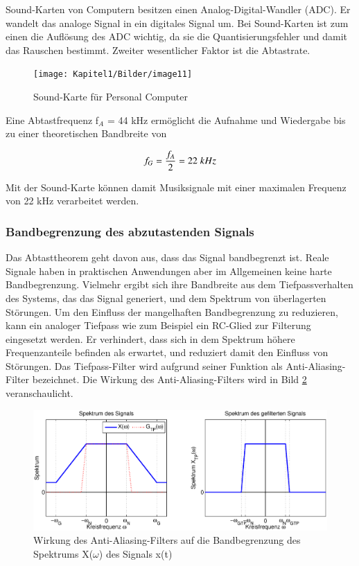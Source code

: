 \noindent Sound-Karten von Computern besitzen einen Analog-Digital-Wandler (ADC). Er wandelt das analoge Signal in ein digitales Signal um. Bei Sound-Karten ist zum einen die Auflösung des ADC wichtig, da sie die Quantisierungsfehler und damit das Rauschen bestimmt. Zweiter wesentlicher Faktor ist die Abtastrate.

\begin{figure}[H]
  \centerline{\texttt{[image: Kapitel1/Bilder/image11]}}
  \caption{Sound-Karte für Personal Computer}
  \label{fig:SoundKarte}
\end{figure}

\noindent Eine Abtastfrequenz f$_{A}$ = 44 kHz ermöglicht die Aufnahme und Wiedergabe bis zu einer theoretischen Bandbreite von 

\begin{equation}\label{eq:twoeighteen}
f_{G} =\frac{f_{A} }{2} =22{\rm \; }kHz
\end{equation}

\noindent Mit der Sound-Karte können damit Musiksignale mit einer maximalen Frequenz von 22 kHz verarbeitet werden.


\subsubsection{Bandbegrenzung des abzutastenden Signals}

\noindent Das Abtasttheorem geht davon aus, dass das Signal bandbegrenzt ist. Reale Signale haben in praktischen Anwendungen aber im Allgemeinen keine harte Bandbegrenzung. Vielmehr ergibt sich ihre Bandbreite aus dem Tiefpassverhalten des Systems, das das Signal generiert, und dem Spektrum von überlagerten Störungen. Um den Einfluss der mangelhaften Bandbegrenzung zu reduzieren, kann ein analoger Tiefpass wie zum Beispiel ein RC-Glied zur Filterung eingesetzt werden. Er verhindert, dass sich in dem Spektrum höhere Frequenzanteile befinden als erwartet, und reduziert damit den Einfluss von Störungen. Das Tiefpass-Filter wird aufgrund seiner Funktion als Anti-Aliasing-Filter bezeichnet. Die Wirkung des Anti-Aliasing-Filters wird in Bild \ref{fig:AntiAliasingFilterWirkung} veranschaulicht.

\begin{figure}[H]
  \centerline{\includegraphics[width=1\textwidth]{Kapitel1/Bilder/image12}}
  \caption{Wirkung des Anti-Aliasing-Filters auf die Bandbegrenzung des Spektrums X($\omega$) des Signals x(t)}
  \label{fig:AntiAliasingFilterWirkung}
\end{figure}

